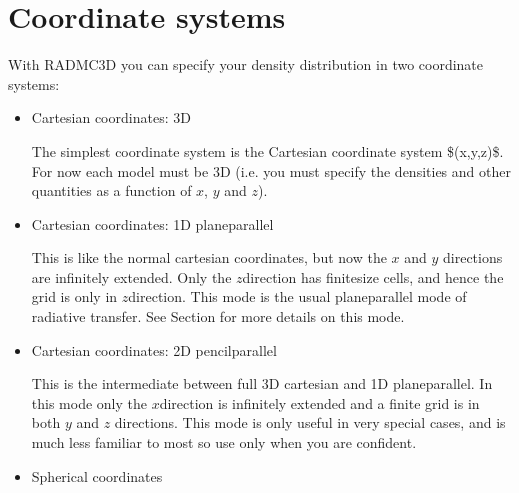 \documentclass[letterpaper,10pt,english]{sphinxmanual}
\begin{document}
\section{Coordinate systems}
\label{\detokenize{basicstructure:coordinate-systems}}\label{\detokenize{basicstructure:sec-coord-systems}}
With RADMC\sphinxhyphen{}3D you can specify your density distribution in two coordinate
systems:
\begin{itemize}
\item {} 
Cartesian coordinates: 3\sphinxhyphen{}D

The simplest coordinate system is the Cartesian coordinate system
\$(x,y,z)\$. For now each model must be 3\sphinxhyphen{}D (i.e. you must specify the
densities and other quantities as a function of \(x\), \(y\) and \(z\)).

\item {} 
Cartesian coordinates: 1\sphinxhyphen{}D plane\sphinxhyphen{}parallel

This is like the normal cartesian coordinates, but now the \(x\)\sphinxhyphen{} and \(y\)\sphinxhyphen{}
directions are infinitely extended. Only the \(z\)\sphinxhyphen{}direction has
finite\sphinxhyphen{}size cells, and hence the grid is only in \(z\)\sphinxhyphen{}direction.  This mode
is the usual plane\sphinxhyphen{}parallel mode of radiative transfer. See Section
{\hyperref[\detokenize{gridding:sec-1d-plane-parallel}]{}} for more details on this mode.

\item {} 
Cartesian coordinates: 2\sphinxhyphen{}D pencil\sphinxhyphen{}parallel

This is the intermediate between full 3\sphinxhyphen{}D cartesian and 1\sphinxhyphen{}D
plane\sphinxhyphen{}parallel.  In this mode only the \(x\)\sphinxhyphen{}direction is infinitely
extended and a finite grid is in both \(y\) and \(z\) directions. This mode is
only useful in very special cases, and is much less familiar to most \sphinxhyphen{} so
use only when you are confident.

\item {} 
Spherical coordinates


\end{itemize}
\end{document}
